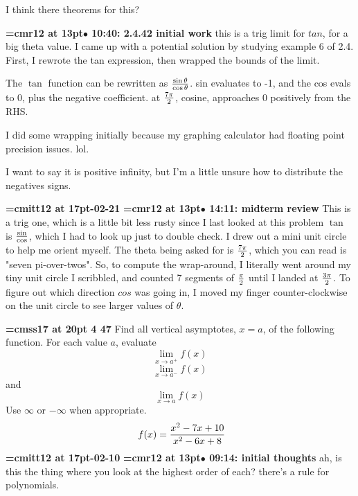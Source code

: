 I think there theorems for this?
\par

{\smallskip\noindent\bf\font\titlefont=cmr12 at 13pt\titlefont $\bullet$ 10:40: 2.4.42 initial work}\smallskip
this is a trig limit for $tan$, for a big theta value. I came up with a potential solution by studying example 6 of 2.4. First, I rewrote the tan expression, then wrapped the bounds of the limit.
\par

The $\tan$ function can be rewritten as ${\sin \theta \over \cos \theta}$. sin evaluates to -1, and the cos evals to 0, plus the negative coefficient. at $7\pi \over 2$, cosine, approaches 0 positively from the RHS.
\par

I did some wrapping initially because my graphing calculator had floating point precision issues. lol.
\par

I want to say it is positive infinity, but I'm a little unsure how to distribute the negatives signs.
\par

{\medskip\noindent\bf\font\titlefont=cmitt12 at 17pt-02-21}\medskip
{\smallskip\noindent\bf\font\titlefont=cmr12 at 13pt\titlefont $\bullet$ 14:11: midterm review}\smallskip
This is a trig one, which is a little bit less rusty since I last looked at this problem $\tan$ is $\sin \over \cos$, which I had to look up just to double check. I drew out a mini unit circle to help me orient myself. The theta being asked for is ${7 \pi \over 2}$, which you can read is "seven pi-over-twos". So, to compute the wrap-around, I literally went around my tiny unit circle I scribbled, and counted 7 segments of $\pi \over 2$ until I landed at ${3 \pi \over 2}$. To figure out which direction $cos$ was going in, I moved my finger counter-clockwise on the unit circle to see larger values of $\theta$.
\par

{\medskip\noindent\bf\font\titlefont=cmss17 at 20pt 4 47}\medskip
Find all vertical asymptotes, $x = a$, of the following
function. For each value $a$, evaluate
$$\lim_{x \to a^{+}}{f(x)}$$
$$\lim_{x \to a^{-}}{f(x)}$$ and
$$\lim_{x \to a}{f(x)}$$
Use $\infty$ or $-\infty$ when
appropriate.
$$\
f(x) = {
x^2 - 7x + 10
\over
x^2 - 6x + 8
}
$$
{\medskip\noindent\bf\font\titlefont=cmitt12 at 17pt-02-10}\medskip
{\smallskip\noindent\bf\font\titlefont=cmr12 at 13pt\titlefont $\bullet$ 09:14: initial thoughts}\smallskip
ah, is this the thing where you look at the highest order of each? there's a rule for polynomials.
\par

